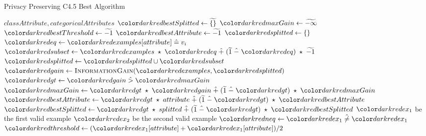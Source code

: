 \begin{algorithm}[H]
\caption{Privacy Preserving C4.5 Best Algorithm}\label{a:c45-best-simple}
\begin{algorithmic}[1]
\renewcommand{\algorithmicrequire}{\textbf{Global Vars:}}
\Require $classAttribute, categoricalAttributes$
  \State $\red{bestSplitted} \gets \enc{\{\}}$
  \State $\red{maxGain} \gets \enc{-\infty}$
  \State $\red{bestThreshold} \gets \enc{-1}$
  \State $\red{bestAttribute} \gets \enc{-1}$
      \State $\red{splitted} \gets \{\}$
        \State $\red{eq} \gets \red{examples}[attribute] \heq v_i$ 
        \State $\red{subset} \gets \red{examples} \hmul \red{eq} \hplus (\enc{1} \hminus \red{eq}) \hmul \enc{-1} $ 
          \State $\red{splitted} \gets \red{splitted} \cup \red{subset}$
        \EndFor
        \State $\red{gain} \gets  \textsc{InformationGain}(\red{examples}, \red{splitted})$
        \State $\red{gt} \gets \red{gain} \hgt  \red{maxGain}$
        \State $\red{maxGain} \gets \red{gt} \hmul \red{gain} \hplus (\enc{1} \hminus \red{gt}) \hmul \red{maxGain}$ 
        \State $\red{bestAttribute} \gets \red{gt} \hmul attribute \hplus (\enc{1} \hminus \red{gt}) \hmul \red{bestAttribute}$
        \State $\red{bestSplitted} \gets \red{gt} \hmul splitted \hplus (\enc{1} \hminus \red{gt}) \hmul \red{bestSplitted}$
    \Else {}
           $\red{ex_1}$ {\small be the first valid example}
           $\red{ex_2}$ {\small be the second valid example}
          \State $\red{neq} \gets \red{ex_1} \hneq \red{ex_1}$
          \State $\red{threshold} \gets (\red{ex_1}[attribute] + \red{ex_1}[attribute]) / 2$

\end{algorithmic}
\end{algorithm}
